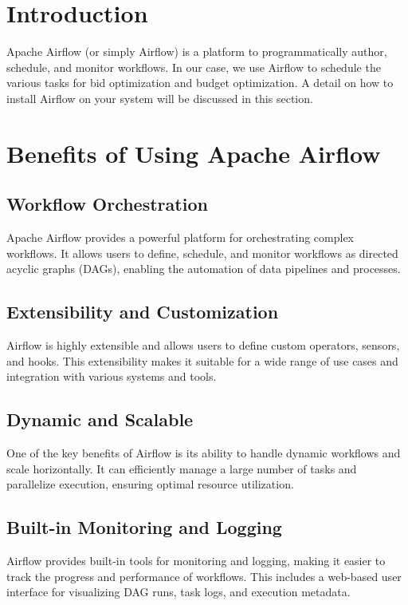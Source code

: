 \section{Introduction}

Apache Airflow (or simply Airflow) is a platform to programmatically author, schedule, and monitor workflows. In our case, we use Airflow to schedule the various tasks for bid optimization and budget optimization. A detail on how to install Airflow on your system will be discussed in this section.

\section{Benefits of Using Apache Airflow}

\subsection{Workflow Orchestration}

Apache Airflow provides a powerful platform for orchestrating complex workflows. It allows users to define, schedule, and monitor workflows as directed acyclic graphs (DAGs), enabling the automation of data pipelines and processes.

\subsection{Extensibility and Customization}

Airflow is highly extensible and allows users to define custom operators, sensors, and hooks. This extensibility makes it suitable for a wide range of use cases and integration with various systems and tools.

\subsection{Dynamic and Scalable}

One of the key benefits of Airflow is its ability to handle dynamic workflows and scale horizontally. It can efficiently manage a large number of tasks and parallelize execution, ensuring optimal resource utilization.

\subsection{Built-in Monitoring and Logging}

Airflow provides built-in tools for monitoring and logging, making it easier to track the progress and performance of workflows. This includes a web-based user interface for visualizing DAG runs, task logs, and execution metadata.

